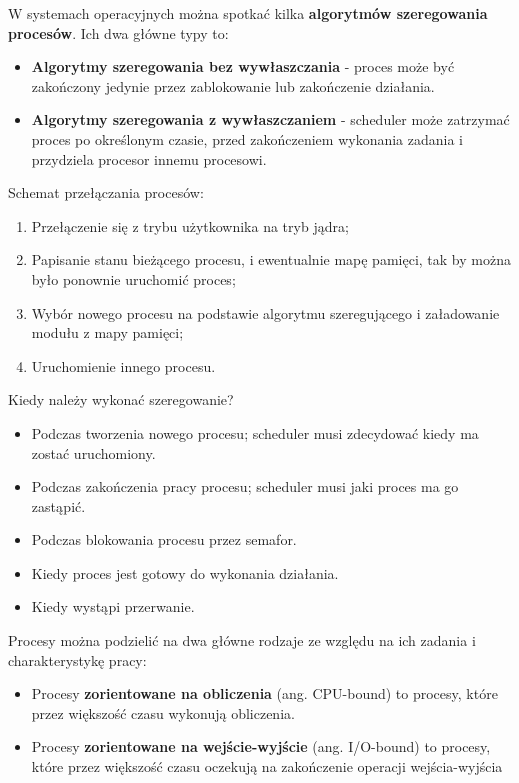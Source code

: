 \documentclass{article}
\begin{document}
W systemach operacyjnych można spotkać kilka \textbf{algorytmów szeregowania procesów}. Ich dwa główne typy to:
\begin{itemize}
    \item \textbf{Algorytmy szeregowania bez wywłaszczania} - proces może być zakończony jedynie przez zablokowanie lub zakończenie działania.
    \item \textbf{Algorytmy szeregowania z wywłaszczaniem} - scheduler może zatrzymać proces po określonym czasie, przed zakończeniem wykonania zadania i przydziela procesor innemu procesowi.
\end{itemize}

Schemat przełączania procesów:
\begin{enumerate}
    \item Przełączenie się z trybu użytkownika na tryb jądra;
    \item Papisanie stanu bieżącego procesu, i ewentualnie mapę pamięci, tak by można było ponownie uruchomić proces;
    \item Wybór nowego procesu na podstawie algorytmu szeregującego i załadowanie modułu z mapy pamięci; 
    \item Uruchomienie innego procesu.
\end{enumerate}

Kiedy należy wykonać szeregowanie?
\begin{itemize}
    \item Podczas tworzenia nowego procesu; scheduler musi zdecydować kiedy ma zostać uruchomiony.
    \item Podczas zakończenia pracy procesu; scheduler musi jaki proces ma go zastąpić.
    \item Podczas blokowania procesu przez semafor.
    \item Kiedy proces jest gotowy do wykonania działania.
    \item Kiedy wystąpi przerwanie.
\end{itemize}

Procesy można podzielić na dwa główne rodzaje ze względu na ich zadania i charakterystykę pracy:
\begin{itemize}
    \item Procesy \textbf{zorientowane na obliczenia} (ang. CPU-bound) to procesy, które przez większość czasu wykonują obliczenia.
    \item Procesy \textbf{zorientowane na wejście-wyjście} (ang. I/O-bound) to procesy, które przez większość czasu oczekują na zakończenie operacji wejścia-wyjścia
\end{itemize}
\end{document}
